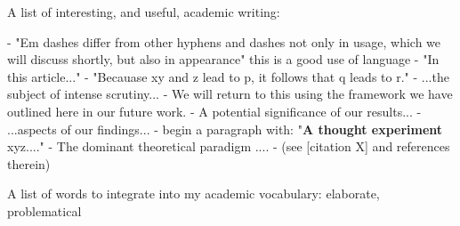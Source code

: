 A list of interesting, and useful, academic writing:

- "Em dashes differ from other hyphens and dashes not only in usage, which we will discuss shortly, but also in appearance" this is a good use of language
- "In this article..."
- "Becauase xy and z lead to p, it follows that q leads to r."
- ...the subject of intense scrutiny...
- We will return to this using the framework we have outlined here in our future work.
- A potential significance of our results...
- ...aspects of our findings...
- begin a paragraph with: "\textbf{A thought experiment} xyz...." 
- The dominant theoretical paradigm ....
- (see [citation X] and references therein)

A list of words to integrate into my academic vocabulary: elaborate, problematical